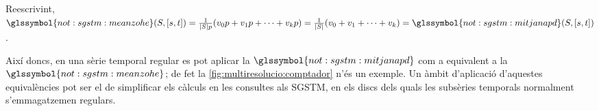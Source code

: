 Reescrivint, $\glssymbol{not:sgstm:meanzohe}(S,[s,t])=
\frac{1}{|S|p} ( v_0p+v_1p+\dotsb+ v_kp ) = \frac{1}{|S|} (
v_0+v_1+\dotsb+ v_k ) = \glssymbol{not:sgstm:mitjanapd}(S,[s,t])$.



Així doncs, en una sèrie temporal regular es pot aplicar la
$\glssymbol{not:sgstm:mitjanapd}$ com a equivalent a la
$\glssymbol{not:sgstm:meanzohe}$; de fet la
\autoref{fig:multiresolucio:comptador} n'és un exemple. Un àmbit
d'aplicació d'aquestes equivalències pot ser el de simplificar els
càlculs en les consultes als \gls{SGSTM}, en els discs dels quals les
subsèries temporals normalment s'emmagatzemen regulars.
 










